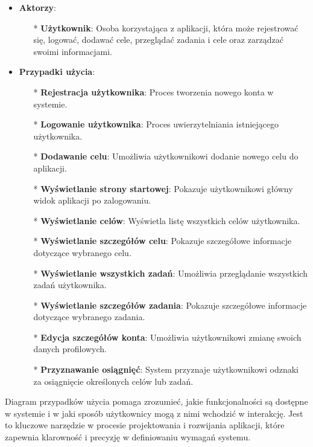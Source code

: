 \begin{itemize}
    \item \textbf{Aktorzy}:
    \begin{itemize}
        \item[*] \textbf{Użytkownik}: Osoba korzystająca z aplikacji, która może rejestrować się, logować, dodawać cele, przeglądać zadania i cele oraz zarządzać swoimi informacjami.
    \end{itemize}
    \clearpage

    \item \textbf{Przypadki użycia}:
    \begin{itemize}
        \item[*] \textbf{Rejestracja użytkownika}: Proces tworzenia nowego konta w systemie.
        \item[*] \textbf{Logowanie użytkownika}: Proces uwierzytelniania istniejącego użytkownika.
        \item[*] \textbf{Dodawanie celu}: Umożliwia użytkownikowi dodanie nowego celu do aplikacji.
        \item[*] \textbf{Wyświetlanie strony startowej}: Pokazuje użytkownikowi główny widok aplikacji po zalogowaniu.
        \item[*] \textbf{Wyświetlanie celów}: Wyświetla listę wszystkich celów użytkownika.
        \item[*] \textbf{Wyświetlanie szczegółów celu}: Pokazuje szczegółowe informacje dotyczące wybranego celu.
        \item[*] \textbf{Wyświetlanie wszystkich zadań}: Umożliwia przeglądanie wszystkich zadań użytkownika.
        \item[*] \textbf{Wyświetlanie szczegółów zadania}: Pokazuje szczegółowe informacje dotyczące wybranego zadania.
        \item[*] \textbf{Edycja szczegółów konta}: Umożliwia użytkownikowi zmianę swoich danych profilowych.
        \item[*] \textbf{Przyznawanie osiągnięć}: System przyznaje użytkownikowi odznaki za osiągnięcie określonych celów lub zadań.
    \end{itemize}
\end{itemize}

Diagram przypadków użycia pomaga zrozumieć, jakie funkcjonalności są dostępne w systemie i w jaki sposób użytkownicy mogą z nimi wchodzić w interakcję. Jest to kluczowe narzędzie w procesie projektowania i rozwijania aplikacji, które zapewnia klarowność i precyzję w definiowaniu wymagań systemu.


